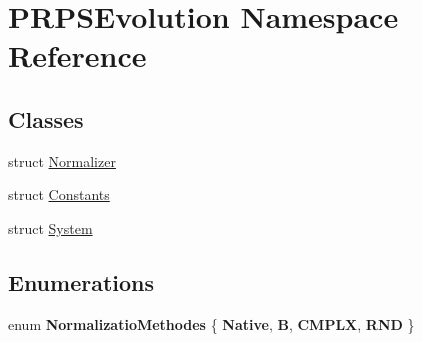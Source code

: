 \hypertarget{namespace_p_r_p_s_evolution}{\section{P\-R\-P\-S\-Evolution Namespace Reference}
\label{namespace_p_r_p_s_evolution}
}
\subsection*{Classes}
\begin{DoxyCompactItemize}
\item 
struct \hyperlink{struct_p_r_p_s_evolution_1_1_normalizer}{Normalizer}
\item 
struct \hyperlink{struct_p_r_p_s_evolution_1_1_constants}{Constants}
\item 
struct \hyperlink{struct_p_r_p_s_evolution_1_1_system}{System}
\end{DoxyCompactItemize}
\subsection*{Enumerations}
\begin{DoxyCompactItemize}
\item 
enum {\bfseries Normalizatio\-Methodes} \{ {\bfseries Native}, 
{\bfseries B}, 
{\bfseries C\-M\-P\-L\-X}, 
{\bfseries R\-N\-D}
 \}
\end{DoxyCompactItemize}

